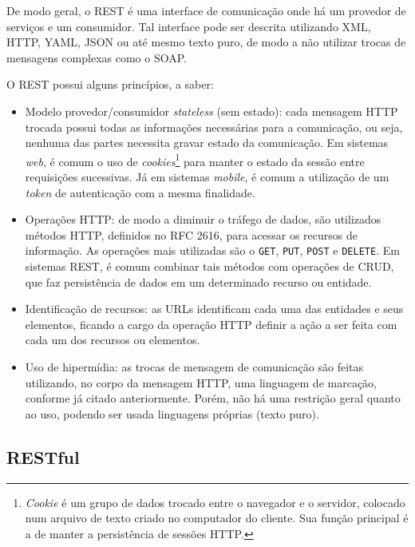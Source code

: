 	De modo geral, o \ac{REST} é uma interface de comunicação onde há um provedor de serviços e um consumidor. Tal interface pode ser descrita utilizando \ac{XML}, \ac{HTTP}, \ac{YAML}, \ac{JSON} ou até mesmo texto puro, de modo a não utilizar trocas de mensagens complexas como o \ac{SOAP}. 

O \ac{REST} possui alguns princípios, a saber:
\begin{itemize}
\item Modelo provedor/consumidor \emph{stateless} (sem estado): cada mensagem \ac{HTTP} trocada possui todas as informações necessárias para a comunicação, ou seja, nenhuma das partes necessita gravar estado da comunicação. Em sistemas \emph{web}, é comum o uso de \emph{cookies}\footnote{\emph{Cookie} é um grupo de dados trocado entre o navegador e o servidor, colocado num arquivo de texto criado no computador do cliente. Sua função principal é a de manter a persistência de sessões \ac{HTTP}.} para manter o estado da sessão entre requisições sucessivas. Já em sistemas \emph{mobile}, é comum a utilização de um \emph{token} de autenticação com a mesma finalidade.

\item Operações \ac{HTTP}: de modo a diminuir o tráfego de dados, são utilizados métodos \ac{HTTP}, definidos no RFC 2616\cite{rfc2616}, para acessar os recursos de informação. As operações mais utilizadas são o \texttt{GET}, \texttt{PUT}, \texttt{POST} e \texttt{DELETE}. Em sistemas \ac{REST}, é comum combinar tais métodos com operações de \ac{CRUD}, que faz persistência de dados em um determinado recurso ou entidade.

\item Identificação de recursos: as URLs identificam cada uma das entidades e seus elementos, ficando a cargo da operação \ac{HTTP} definir a ação a ser feita com cada um dos recursos ou elementos.

\item Uso de hipermídia: as trocas de mensagem de comunicação são feitas utilizando, no corpo da mensagem \ac{HTTP}, uma linguagem de marcação, conforme já citado anteriormente. Porém, não há uma restrição geral quanto ao uso, podendo ser usada linguagens próprias (texto puro).

\end{itemize}
\subsection{RESTful}

